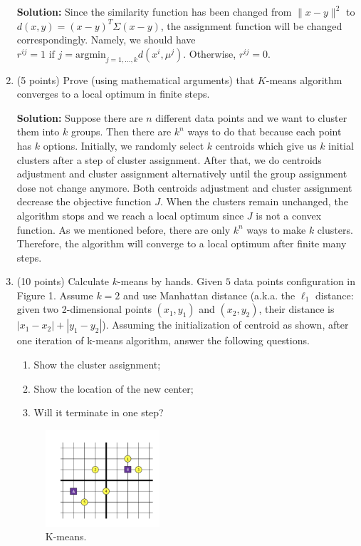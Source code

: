\documentclass[twoside,10pt]{article}
\begin{document}
\begin{enumerate}
   \begin{tcolorbox}
   \textbf{Solution:} Since the similarity function has been changed from $\|x-y\|^2$ to $d(x,y) = (x-y)^T\Sigma(x-y)$, the assignment function will be changed correspondingly. Namely, we should have
   $r^{ij} = 1 \text{ if } j = \text{argmin}_{j=1,...,k}d(x^i,\mu^j).$ Otherwise, $r^{ij} =0$.
   \end{tcolorbox}
   
   
\item (5 points) Prove (using mathematical arguments) that $K$-means algorithm converges to a local optimum in finite steps.

\begin{tcolorbox}
\textbf{Solution:} Suppose there are $n$ different data points and we want to cluster them into $k$ groups. Then there are $k^n$ ways to do that because each point has $k$ options. Initially, we randomly select $k$ centroids which give us $k$ initial clusters after a step of cluster assignment. After that, we do centroids adjustment and cluster assignment alternatively until the group assignment dose not change anymore. Both centroids adjustment and cluster assignment decrease the objective function $J$. When the clusters remain unchanged, the algorithm stops and we reach a local optimum since $J$ is not a convex function. As we mentioned before, there are only $k^n$ ways to make $k$ clusters. Therefore, the algorithm will converge to a local optimum after finite many steps.
\end{tcolorbox}

\item (10 points) Calculate $k$-means by hands.  Given $5$ data points configuration in Figure 1. Assume $k = 2$ and use Manhattan distance (a.k.a. the $\ell_1$ distance: given two 2-dimensional points $(x_1, y_1)$ and $(x_2, y_2)$, their distance is $|x_1 - x_2| + |y_1 - y_2|$).  Assuming the initialization of centroid as shown, after one iteration of k-means algorithm, answer the following questions. 

\begin{enumerate}
\item Show the cluster assignment;
\item Show the location of the new center;
\item Will it terminate in one step?
\end{enumerate}

\begin{figure}[h!]
\begin{center}
\includegraphics[width = 0.4\textwidth]{images/points.png}
\end{center}
\caption{K-means.}
\end{figure}


\end{enumerate}
\end{document}
